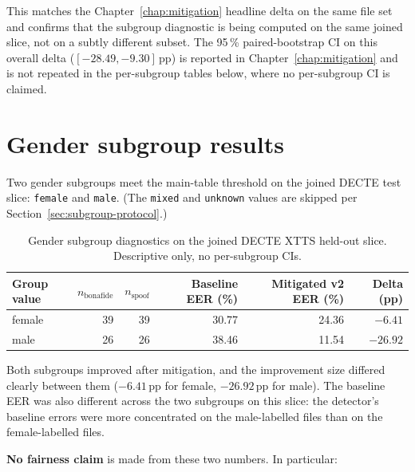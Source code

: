 This matches the Chapter~\ref{chap:mitigation} headline delta on the same file set
and confirms that the subgroup diagnostic is being computed on
the same joined slice, not on a subtly different subset. The
95\,\% paired-bootstrap CI on this overall delta ($[-28.49, -9.30]$\,pp)
is reported in Chapter~\ref{chap:mitigation} and is not repeated in the
per-subgroup tables below, where no per-subgroup CI is claimed.


\section{Gender subgroup results}
\label{sec:subgroup-gender}

Two gender subgroups meet the main-table threshold on the joined
DECTE test slice: \texttt{female} and \texttt{male}. (The \texttt{mixed} and
\texttt{unknown} values are skipped per Section~\ref{sec:subgroup-protocol}.)

\begin{table}[t]
\centering
\caption{Gender subgroup diagnostics on the joined DECTE XTTS held-out slice. Descriptive only, no per-subgroup CIs.}
\label{tab:subgroup-gender}
\scriptsize
\setlength{\tabcolsep}{4pt}
\begin{tabularx}{\linewidth}{X r r r r r}
\toprule
\textbf{Group value} & \textbf{$n_\text{bonafide}$} & \textbf{$n_\text{spoof}$} & \textbf{Baseline EER (\%)} & \textbf{Mitigated v2 EER (\%)} & \textbf{Delta (pp)} \\
\midrule
female & 39 & 39 & 30.77 & 24.36 & $-6.41$ \\
male   & 26 & 26 & 38.46 & 11.54 & $\mathbf{-26.92}$ \\
\bottomrule
\end{tabularx}
\end{table}

Both subgroups improved after mitigation, and the improvement
size differed clearly between them ($-6.41$\,pp for female, $-26.92$\,pp
for male). The baseline EER was also different across the two
subgroups on this slice: the detector's baseline errors were more
concentrated on the male-labelled files than on the female-labelled
files.

\textbf{No fairness claim} is made from these two numbers. In particular:

